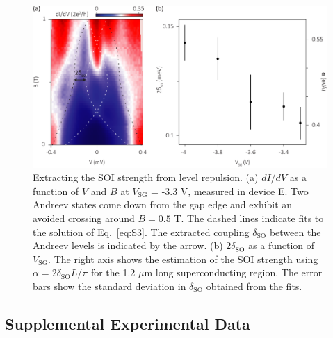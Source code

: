 \begin{figure}
\begin{center}
\includegraphics[width=\columnwidth]{chapter_spinorbit/figures/SFig3_Anticrossing.pdf}
\caption{\label{fig:SOIlevelrep}
Extracting the SOI strength from level repulsion.
(a) $dI/dV$ as a function of $V$ and $B$ at $V_{\mathrm{SG}}$ = -3.3 V, measured in device E.
Two Andreev states come down from the gap edge and exhibit an avoided crossing around $B = 0.5$ T.
The dashed lines indicate fits to the solution of Eq.~\eqref{eq:S3}.
The extracted coupling $\delta_{\mathrm{SO}}$ between the Andreev levels is indicated by the arrow.
(b) $2\delta_{\mathrm{SO}}$ as a function of $V_{\mathrm{SG}}$.
The right axis shows the estimation of the SOI strength using $\alpha = 2\delta_{\mathrm{SO}}L/\pi$ for the 1.2 $\mu$m long superconducting region.
The error bars show the standard deviation in $\delta_{\mathrm{SO}}$ obtained from the fits.
}
\end{center}
\end{figure}

\clearpage
\subsection{Supplemental Experimental Data}

